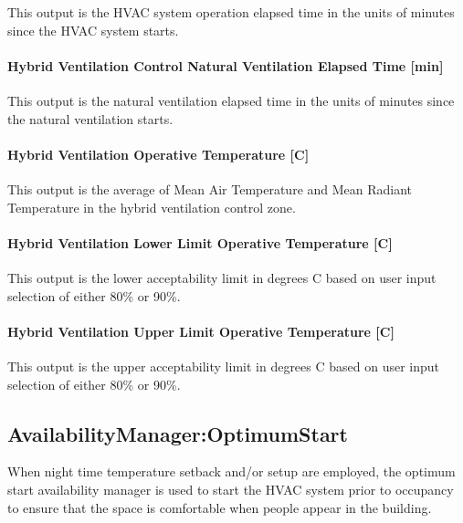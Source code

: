 This output is the HVAC system operation elapsed time in the units of minutes since the HVAC system starts.

\paragraph{Hybrid Ventilation Control Natural Ventilation Elapsed Time {[min]}}\label{hybrid-ventilation-control-natural-ventilation-elapsed-time}

This output is the natural ventilation elapsed time in the units of minutes since the natural ventilation starts.

\paragraph{Hybrid Ventilation Operative Temperature {[C]}}\label{hybrid-ventilation-operative-temperature}

This output is the average of Mean Air Temperature and Mean Radiant Temperature in the hybrid ventilation control zone.

\paragraph{Hybrid Ventilation Lower Limit Operative Temperature {[C]}}\label{hybrid-ventilation-lower-limit-operative-temperature}

This output is the lower acceptability limit in degrees C based on user input selection of either 80\% or 90\%.

\paragraph{Hybrid Ventilation Upper Limit Operative Temperature {[C]}}\label{hybrid-ventilation-upper-limit-operative-temperature}

This output is the upper acceptability limit in degrees C based on user input selection of either 80\% or 90\%.

\subsection{AvailabilityManager:OptimumStart}\label{availabilitymanageroptimumstart}

When night time temperature setback and/or setup are employed, the optimum start availability manager is used to start the HVAC system prior to occupancy to ensure that the space is comfortable when people appear in the building.


